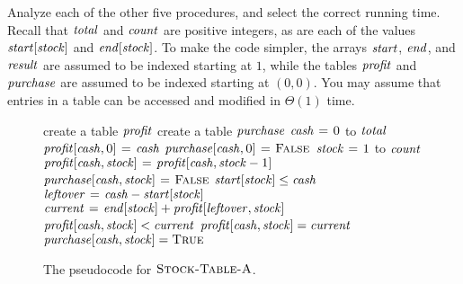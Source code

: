 \documentclass[12pt,twoside]{article}
\begin{document}
\begin{problems}
\newcommand{\runtimeAnswers}{
\vspace{0.5em}
\begin{enumerate}
\begin{minipage}{0.49\textwidth}
\item \ensuremath{\Theta(\stockCount)}
\item \ensuremath{\Theta(\stockCount^2)}
\item \ensuremath{\Theta(\stockCount^3)}
\item \ensuremath{\Theta(\total)}
\item \ensuremath{\Theta(\total^2)}
\item \ensuremath{\Theta(\total^3)}
\end{minipage}
\hfill
\begin{minipage}{0.49\textwidth}
\item \ensuremath{\Theta(\stockCount + \total)}
\item \ensuremath{\Theta(\stockCount^2 + \total)}
\item \ensuremath{\Theta(\stockCount + \total^2)}
\item \ensuremath{\Theta(\stockCount \cdot \total)}
\item \ensuremath{\Theta(\stockCount^2 \cdot \total)}
\item \ensuremath{\Theta(\stockCount \cdot \total^2)}
\end{minipage}
\end{enumerate}
}

Analyze each of the other five procedures,
and select the correct running time.
Recall that $\total$ and $\stockCount$ are positive integers,
as are each of the values $\priceStart[\stock]$ and $\priceEnd[\stock]$.
To make the code simpler,
the arrays $\priceStart$, $\priceEnd$, and $\result$
are assumed to be indexed starting at $1$,
while the tables $\profit$ and $\purchase$
are assumed to be indexed starting at $(0, 0)$.
You may assume that entries in a table
can be accessed and modified in $\Theta(1)$ time.

\begin{figure}[p]
\begin{codebox}
\li create a table $\profit$
\li create a table $\purchase$
\li \For $\cash \gets \const{0}$ to $\total$ \Do
\li		$\profit[\cash, \const{0}] \gets \cash$
\li		$\purchase[\cash, \const{0}] \gets \const{False}$
\li		\For $\stock \gets \const{1}$ to $\stockCount$ \Do
\li			$\profit[\cash, \stock] \gets
					\profit[\cash, \stock - \const{1}]$
\li			$\purchase[\cash, \stock] \gets \const{False}$
\li			\If $\priceStart[\stock] \le \cash$ \Then
\li				$\leftover \gets \cash - \priceStart[\stock]$
\li				$\current \gets \priceEnd[\stock] +
						\profit[\leftover, \stock]$
\li				\If $\profit[\cash, \stock] < \current$ \Then
\li					$\profit[\cash, \stock] = \current$
\li					$\purchase[\cash, \stock] = \const{True}$
	 			\End
			\End
		\End
	\End
\li \Return \purchase
\end{codebox}
\caption{The pseudocode for $\textnormal{\scshape Stock-Table-A}$.}
\label{fig:table-A}


\end{figure}
\end{problems}
\end{document}

